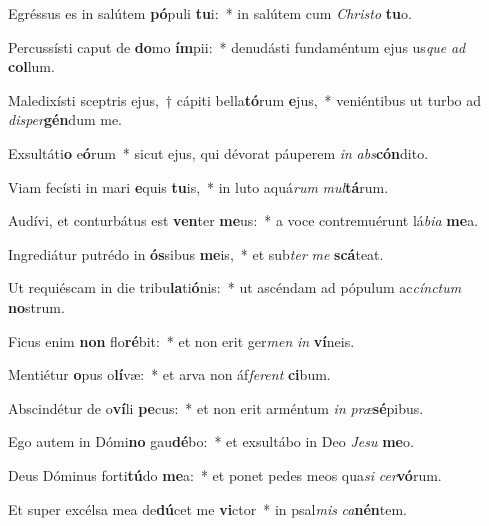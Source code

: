 \item Egréssus es in salútem \textbf{pó}puli \textbf{tu}i:~* in salútem cum \textit{Christo} \textbf{tu}o.
\item Percussísti caput de \textbf{do}mo \textbf{ím}pii:~* denudásti fundaméntum ejus us\tinyhspace\textit{que} \textit{ad} \textbf{col}lum.
\item Maledixísti sceptris ejus,~† cápiti bella\textbf{tó}rum \textbf{e}jus,~* veniéntibus ut turbo ad \textit{disper}\textbf{gén}dum me.
\item Exsultáti\textbf{o} e\textbf{ó}rum~* sicut ejus, qui dévorat páuperem \textit{in} \textit{abs}\textbf{cón}dito.
\item Viam fecísti in mari \textbf{e}quis \textbf{tu}is,~* in luto aquá\spurhspace\textit{rum} \textit{mul}\textbf{tá}rum.
\item Audívi, et conturbátus est \textbf{ven}ter \textbf{me}us:~* a voce contremuérunt lá\textit{bia} \textbf{me}a.
\item Ingrediátur putrédo in \textbf{ós}sibus \textbf{me}is,~* et sub\textit{ter} \textit{me} \textbf{scá}teat.
\item Ut requiéscam in die tribu\textbf{la}ti\textbf{ó}nis:~* ut ascéndam ad pópulum ac\textit{cínctum} \textbf{no}strum.
\item Ficus enim \textbf{non} flo\textbf{ré}bit:~* et non erit ger\textit{men} \textit{in} \textbf{ví}neis.
\item Mentiétur \textbf{o}pus o\textbf{lí}væ:~* et arva non áf\textit{ferent} \textbf{ci}bum.
\item Abscindétur de o\textbf{ví}li \textbf{pe}cus:~* et non erit arméntum \textit{in} \textit{præ}\textbf{sé}pibus.
\item Ego autem in Dómi\textbf{no} gau\textbf{dé}bo:~* et exsultábo in Deo \textit{Jesu} \textbf{me}o.
\item Deus Dóminus forti\textbf{tú}do \textbf{me}a:~* et ponet pedes meos qua\spurhspace\textit{si} \textit{cer}\textbf{vó}rum.
\item Et super excélsa mea de\textbf{dú}cet me \textbf{vi}ctor~* in psal\tinyhspace\textit{mis} \textit{ca}\textbf{nén}tem.
